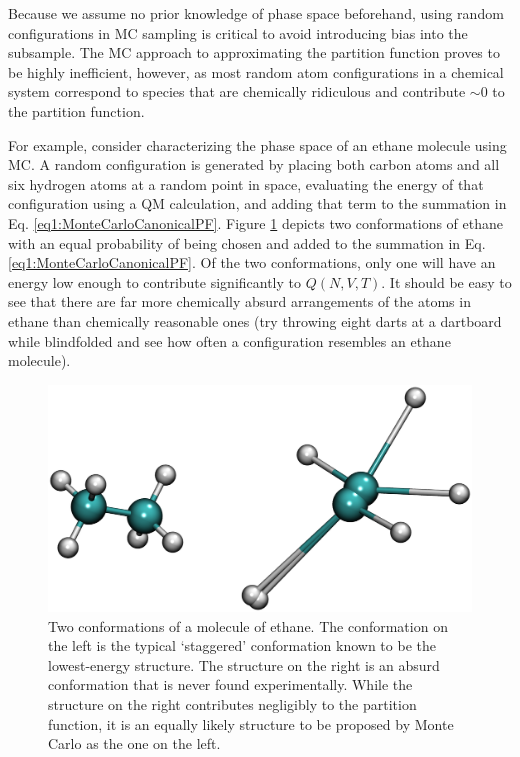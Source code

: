 Because we assume no prior knowledge of phase space beforehand, using random
configurations in MC sampling is critical to avoid introducing bias into the
subsample. The MC approach to approximating the partition function proves to be
highly inefficient, however, as most random atom configurations in a chemical
system correspond to species that are chemically ridiculous and contribute $\sim
0$ to the partition function.

For example, consider characterizing the phase space of an ethane molecule using
MC. A random configuration is generated by placing both carbon atoms and all six
hydrogen atoms at a random point in space, evaluating the energy of that
configuration using a QM calculation, and adding that term to the summation in
Eq. \ref{eq1:MonteCarloCanonicalPF}. Figure \ref{fig1:EthaneMC} depicts two
conformations of ethane with an equal probability of being chosen and added to
the summation in Eq. \ref{eq1:MonteCarloCanonicalPF}. Of the two conformations,
only one will have an energy low enough to contribute significantly to $Q(N, V,
T)$. It should be easy to see that there are far more chemically absurd
arrangements of the atoms in ethane than chemically reasonable ones (try
throwing eight darts at a dartboard while blindfolded and see how often a
configuration resembles an ethane molecule).

\begin{figure}
   \includegraphics[width=6.5in]{EthaneMC.ps}
   \caption{Two conformations of a molecule of ethane. The conformation on the
            left is the typical `staggered' conformation known to be the
            lowest-energy structure. The structure on the right is an absurd
            conformation that is never found experimentally. While the structure
            on the right contributes negligibly to the partition function, it is
            an equally likely structure to be proposed by Monte Carlo as the one
            on the left.}
   \label{fig1:EthaneMC}
\end{figure}

